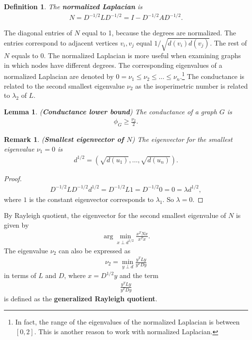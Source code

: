 \documentclass[]{article}
\newtheorem{lemma}{Lemma}[section]
\newtheorem{remark}{Remark}[section]
\newtheorem{definition}{Definition}[section] %
\begin{document}
	\begin{definition}
		The \textbf{normalized Laplacian} is 
		\begin{align*}
		N = D^{-1/2} L D^{-1/2} = I - D^{-1/2} A D^{-1/2}.
		\end{align*}
	\end{definition}
	The diagonal entries of $N$ equal to 1, because the degrees are normalized. The entries correspond to adjacent vertices $v_i,v_j$ equal $1/\sqrt{d(v_i)d(v_j)}$. The rest of $N$ equals to 0. The normalized Laplacian is more useful when examining graphs in which nodes have different degrees. The corresponding eigenvalues of a normalized Laplacian are denoted by $0=\nu_1 \le \nu_2 \le \dots \le \nu_n$.\footnote{In fact, the range of the eigenvalues of the normalized Laplacian is between $[0,2]$. This is another reason to work with normalized Laplacian.} The conductance is related to the second smallest eigenvalue $\nu_2$ as the isoperimetric number is related to $\lambda_2$ of $L$. 
	
	\begin{lemma} (\textbf{Conductance lower bound})
		The conductance of a graph $G$ is 
		\begin{align*}
		\phi_G \ge \frac{\nu_2}{2}.
		\end{align*}
	\end{lemma}
	
	\begin{remark} (\textbf{Smallest eigenvector of $N$})
		The eigenvector for the smallest eigenvalue $\nu_1=0$ is 
		\begin{align*}
		d^{1/2}=(\sqrt{d(u_1)}, \dots, \sqrt{d(u_n)}).
		\end{align*}
	\end{remark}
	\begin{proof}
		\begin{align*}
		D^{-1/2} L D^{-1/2} d^{1/2} = D^{-1/2} L 1 = D^{-1/2} 0 = 0 = \lambda d^{1/2},
		\end{align*}
		where $1$ is the constant eigenvector corresponds to $\lambda_1$. So $\lambda=0$.
	\end{proof}
	
	By Rayleigh quotient, the eigenvector for the second smallest eigenvalue of $N$ is given by 
	\begin{align*}
	\arg \min_{x \perp d^{1/2}} \frac{x^T N x}{x^T x}.
	\end{align*}
	The eigenvalue $\nu_2$ can also be expressed as 
	\begin{align*}
	\nu_2 = \min_{y \perp d} \frac{y^T L y}{y^T D y}
	\end{align*}
	in terms of $L$ and $D$, where $x = D^{1/2} y$ and the term 
	\begin{align*}
	\frac{y^T L y}{y^T D y}
	\end{align*}
	is defined as the \textbf{generalized Rayleigh quotient}. 
	
\end{document}
